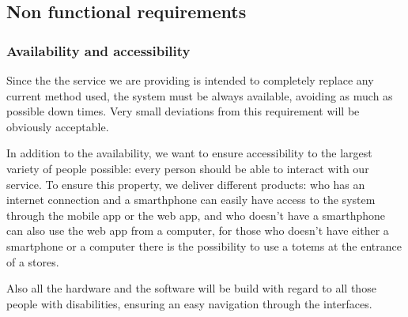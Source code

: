%
\subsection{Non functional requirements}
\label{subsect:softwaresystemattributes}

\subsubsection{Availability and accessibility}
\label{subsubsect:availabilityandaccessibility}

Since the the service we are providing is intended to completely replace any current method used, the system must be always available, avoiding as much as possible down times. Very small deviations from this requirement will be obviously acceptable.

In addition to the availability, we want to ensure accessibility to the largest variety of people possible: every person should be able to interact with our service. To ensure this property, we deliver different products: who has an internet connection and a smarthphone can easily have access to the system through the mobile app or the web app, and who doesn't have a smarthphone can also use the web app from a computer, for those who doesn't have either a smartphone or a computer there is the possibility to use a totems at the entrance of a stores.

Also all the hardware and the software will be build with regard to all those people with disabilities, ensuring an easy navigation through the interfaces.

